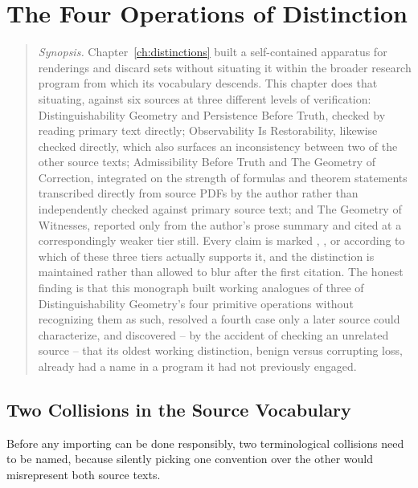 \chapter{The Four Operations of Distinction}
\label{ch:four-operations}

\begin{quotation}
\noindent\textit{Synopsis.} Chapter~\ref{ch:distinctions} built a self-contained
apparatus for renderings and discard sets without situating it within the
broader research program from which its vocabulary descends. This chapter
does that situating, against six sources at three different levels of
verification: Distinguishability Geometry and Persistence Before Truth,
checked by reading primary text directly; Observability Is Restorability,
likewise checked directly, which also surfaces an inconsistency between
two of the other source texts; Admissibility Before Truth and The
Geometry of Correction, integrated on the strength of formulas and
theorem statements transcribed directly from source PDFs by the author
rather than independently checked against primary source text; and The
Geometry of Witnesses, reported only from the author's prose summary and
cited at a correspondingly weaker tier still. Every claim is marked \imported{},
\transcribed{}, or \secondary{} according to which of these three tiers
actually supports it, and the distinction is maintained rather than
allowed to blur after the first citation. The honest finding is that
this monograph built working analogues of three of Distinguishability
Geometry's four primitive operations without recognizing them as such,
resolved a fourth case only a later source could characterize, and
discovered -- by the accident of checking an unrelated source -- that
its oldest working distinction, benign versus corrupting loss, already
had a name in a program it had not previously engaged.
\end{quotation}

\section{Two Collisions in the Source Vocabulary}
\label{sec:collisions}

Before any importing can be done responsibly, two terminological collisions
need to be named, because silently picking one convention over the other
would misrepresent both source texts.

